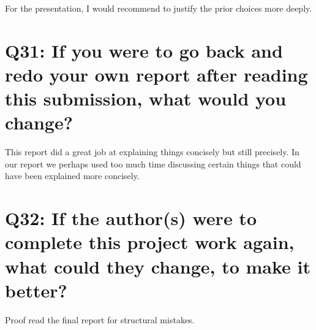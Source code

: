 \documentclass[11pt,a4paper]{article}
\begin{document}
For the presentation, I would recommend to justify the prior choices more deeply.

\section{Q31: If you were to go back and redo your own report after reading this submission, what would you change?}

This report did a great job at explaining things concisely but still precisely. In our report we perhaps used too much time discussing certain things that could have been explained more concisely.

\section{Q32: If the author(s) were to complete this project work again, what could they change, to make it better?}

Proof read the final report for structural mistakes.
\end{document}
